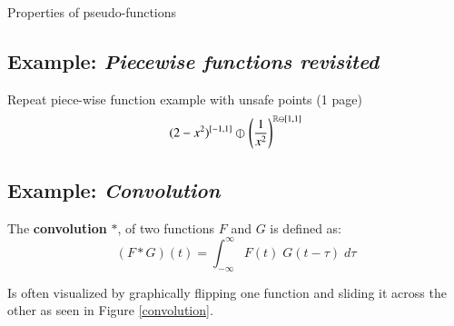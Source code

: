 Properties of pseudo-functions


\subsection{Example: \emph{Piecewise functions revisited}}
Repeat piece-wise function example with unsafe points (1 page)
\begin{equation}
(2-x^2)^{[-1,1]} \varobar^{} \left( \frac{1}{x^2} \right)^{\mathbb{R} \ominus [1,1]}
\end{equation}


\subsection{Example: \emph{Convolution}}


\begin{definition}
	The \textbf{convolution} $*$, of two functions $F$ and $G$ is defined as:
	\begin{equation}
		(F*G)(t) = \int_{-\infty}^\infty F(t) \;G(t - \tau) \; d\tau
	\end{equation}
\end{definition}

Is often visualized by graphically flipping one function and sliding it across the other as seen in Figure \ref{convolution}.

